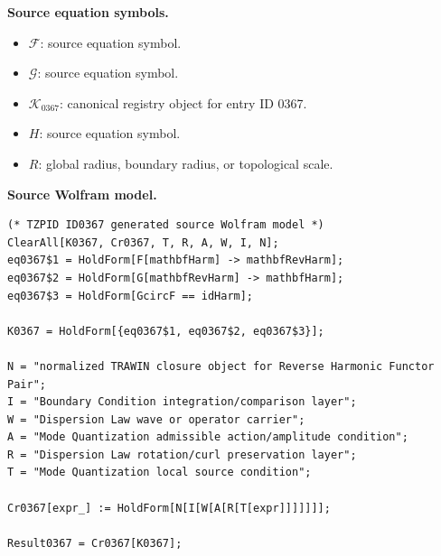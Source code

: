 \begin{minipage}[t]{0.49\linewidth}
\begingroup
\small
\raggedright
\textbf{Source equation symbols.}\par
\begin{itemize}[leftmargin=1.35em,itemsep=1pt,topsep=1pt,parsep=0pt]
    \item $\mathcal{F}$: source equation symbol.
    \item $\mathcal{G}$: source equation symbol.
    \item $\mathcal{K}_{0367}$: canonical registry object for entry ID 0367.
    \item $H$: source equation symbol.
    \item $R$: global radius, boundary radius, or topological scale.
\end{itemize}
\endgroup
\end{minipage}\hfill
\begin{minipage}[t]{0.47\linewidth}
\begingroup
\scriptsize
\raggedright
\textbf{Source Wolfram model.}\par
\begin{Verbatim}[fontsize=\tiny,breaklines=true,breakanywhere=true]
(* TZPID ID0367 generated source Wolfram model *)
ClearAll[K0367, Cr0367, T, R, A, W, I, N];
eq0367$1 = HoldForm[F[mathbfHarm] -> mathbfRevHarm];
eq0367$2 = HoldForm[G[mathbfRevHarm] -> mathbfHarm];
eq0367$3 = HoldForm[GcircF == idHarm];

K0367 = HoldForm[{eq0367$1, eq0367$2, eq0367$3}];

N = "normalized TRAWIN closure object for Reverse Harmonic Functor Pair";
I = "Boundary Condition integration/comparison layer";
W = "Dispersion Law wave or operator carrier";
A = "Mode Quantization admissible action/amplitude condition";
R = "Dispersion Law rotation/curl preservation layer";
T = "Mode Quantization local source condition";

Cr0367[expr_] := HoldForm[N[I[W[A[R[T[expr]]]]]]];

Result0367 = Cr0367[K0367];
\end{Verbatim}
\endgroup
\end{minipage}

